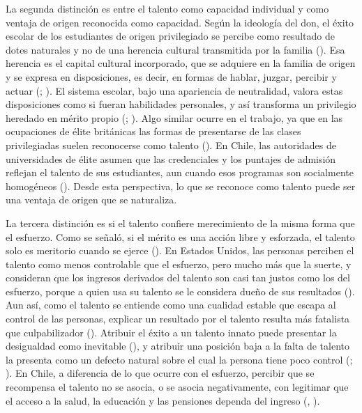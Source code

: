 \documentclass[
  spanish,
  a4paper,
  oneside]{scrbook}
\begin{document}
La segunda distinción es entre el talento como capacidad individual y
como ventaja de origen reconocida como capacidad. Según la ideología del
don, el éxito escolar de los estudiantes de origen privilegiado se
percibe como resultado de dotes naturales y no de una herencia cultural
transmitida por la familia
().
Esa herencia es el capital cultural incorporado, que se adquiere en la
familia de origen y se expresa en disposiciones, es decir, en formas de
hablar, juzgar, percibir y actuar
(;
). El
sistema escolar, bajo una apariencia de neutralidad, valora estas
disposiciones como si fueran habilidades personales, y así transforma un
privilegio heredado en mérito propio
(;
). Algo
similar ocurre en el trabajo, ya que en las ocupaciones de élite
británicas las formas de presentarse de las clases privilegiadas suelen
reconocerse como talento (). En Chile, las autoridades de universidades de élite
asumen que las credenciales y los puntajes de admisión reflejan el
talento de sus estudiantes, aun cuando esos programas son socialmente
homogéneos (). Desde esta perspectiva, lo que se reconoce
como talento puede ser una ventaja de origen que se naturaliza.

La tercera distinción es si el talento confiere merecimiento de la misma
forma que el esfuerzo. Como se señaló, si el mérito es una acción libre
y esforzada, el talento solo es meritorio cuando se ejerce
(). En Estados Unidos,
las personas perciben el talento como menos controlable que el esfuerzo,
pero mucho más que la suerte, y consideran que los ingresos derivados
del talento son casi tan justos como los del esfuerzo, porque a quien
usa su talento se le considera dueño de sus resultados
(). Aun
así, como el talento se entiende como una cualidad estable que escapa al
control de las personas, explicar un resultado por el talento resulta
más fatalista que culpabilizador
(). Atribuir el éxito a un talento innato puede presentar
la desigualdad como inevitable
(), y
atribuir una posición baja a la falta de talento la presenta como un
defecto natural sobre el cual la persona tiene poco control
(;
). En Chile, a diferencia de lo
que ocurre con el esfuerzo, percibir que se recompensa el talento no se
asocia, o se asocia negativamente, con legitimar que el acceso a la
salud, la educación y las pensiones dependa del ingreso
(,
).
\end{document}
